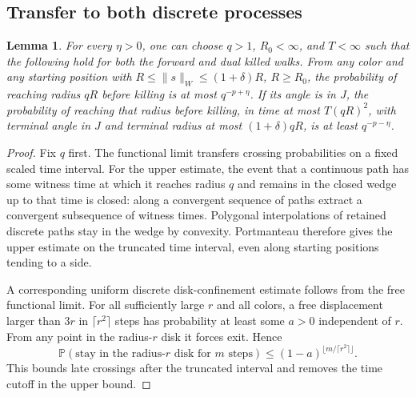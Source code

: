 \documentclass[11pt,letterpaper]{article}
\newtheorem{lemma}[theorem]{Lemma}
\theoremstyle{remark}\newtheorem{remark}[theorem]{Remark}
\newcommand{\Prob}{\mathbb P}
\newcommand{\1}{\mathbf1}
\begin{document}
\subsection{Transfer to both discrete processes}
\begin{lemma}\label{icw:log:lem:annuli}
For every $\eta>0$, one can choose $q>1$, $R_0<\infty$, and $T<\infty$
such that the following hold for both the forward and dual killed walks.
From any color and any starting position with
$R\le\|s\|_W\le(1+\delta)R$, $R\ge R_0$, the probability of reaching
radius $qR$ before killing is at most $q^{-p+\eta}$. If its angle is in
$J$, the probability of reaching that radius before killing, in time at
most $T(qR)^2$, with terminal angle in $J$ and terminal radius at most
$(1+\delta)qR$, is at least $q^{-p-\eta}$.
\end{lemma}
\begin{proof}
Fix $q$ first. The functional limit transfers crossing probabilities
on a fixed scaled time interval. For the upper estimate, the event that
a continuous path has some witness time at which it reaches radius $q$
and remains in the closed wedge up to that time is closed: along a
convergent sequence of paths extract a convergent subsequence of witness
times. Polygonal interpolations of retained discrete paths stay in the
wedge by convexity. Portmanteau therefore gives the upper estimate on
the truncated time interval, even along starting positions tending to
a side.

A corresponding uniform discrete disk-confinement estimate follows
from the free functional limit. For all sufficiently large $r$ and
all colors, a free displacement larger than $3r$ in $\lceil r^2\rceil$
steps has probability at least some $a>0$ independent of $r$. From
any point in the radius-$r$ disk it forces exit. Hence
\begin{equation}\label{icw:log:eq:confine}
 \Prob(\text{stay in the radius-}r\text{ disk for }m\text{ steps})
 \le (1-a)^{\lfloor m/\lceil r^2\rceil\rfloor}.
\end{equation}
This bounds late crossings after the truncated interval and removes
the time cutoff in the upper bound.


\end{proof}
\end{document}
